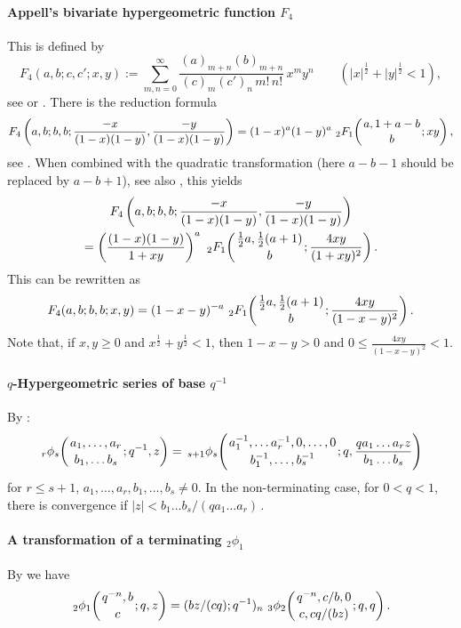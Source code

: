 \documentclass[twoside,11pt]{article}
\newcommand\half{\frac12}
\newcommand\thalf{\tfrac12}
\newcommand\iy\infty
\newcommand{\hyp}[5]{\,\mbox{}_{#1}F_{#2}\!\left(
  \genfrac{}{}{0pt}{}{#3}{#4};#5\right)}
\newcommand{\qhyp}[5]{\,\mbox{}_{#1}\phi_{#2}\!\left(
  \genfrac{}{}{0pt}{}{#3}{#4};#5\right)}
\begin{document}
\paragraph{Appell's bivariate hypergeometric function $F_4$}
This is defined by
\begin{equation}
F_4(a,b;c,c';x,y):=\sum_{m,n=0}^\iy\frac{(a)_{m+n}(b)_{m+n}}{(c)_m(c')_n\,m!\,n!}\,
x^my^n\qquad(|x|^\half+|y|^\half<1),
\label{62}
\end{equation}
see  or .
There is the reduction formula
\begin{equation*}
F_4\left(a,b;b,b;\frac{-x}{(1-x)(1-y)},\frac{-y}{(1-x)(1-y)}\right)=
(1-x)^a(1-y)^a\,\hyp21{a,1+a-b}b{xy},
\end{equation*}
see . When combined with the quadratic transformation
 (here $a-b-1$ should be replaced by $a-b+1$),
see also , this yields
\begin{multline*}
F_4\left(a,b;b,b;\frac{-x}{(1-x)(1-y)},\frac{-y}{(1-x)(1-y)}\right)\\
=\left(\frac{(1-x)(1-y)}{1+xy}\right)^a\,
\hyp21{\thalf a,\thalf(a+1)}b{\frac{4xy}{(1+xy)^2}}.
\end{multline*}
This can be rewritten as
\begin{equation}
F_4(a,b;b,b;x,y)=(1-x-y)^{-a}\,\hyp21{\thalf a,\thalf(a+1)}b
{\frac{4xy}{(1-x-y)^2}}.
\label{63}
\end{equation}
Note that, if $x,y\ge0$ and $x^\half+y^\half<1$, then
$1-x-y>0$ and $0\le\frac{4xy}{(1-x-y)^2}<1$.
%
\paragraph{$q$-Hypergeometric series of base $q^{-1}$}
By :
\begin{equation}
\qhyp rs{a_1,\ldots,a_r}{b_1,\ldots b_s}{q^{-1},z}
=\qhyp{s+1}s{a_1^{-1},\ldots a_r^{-1},0,\ldots,0}
{b_1^{-1},\ldots,b_s^{-1}}{q,\frac{qa_1\ldots a_rz}{b_1\ldots b_s}}
\label{154}
\end{equation}
for $r\le s+1$, $a_1,\ldots,a_r,b_1,\ldots,b_s\ne0$.
In the non-terminating case, for $0<q<1$, there is convergence if
$|z|<b_1\ldots b_s/(qa_1\ldots a_r)$\,.
%
\paragraph{A transformation of a terminating ${}_2\phi_1$}
By  we have
\begin{equation}
\qhyp21{q^{-n},b}c{q,z}=(bz/(cq);q^{-1})_n\,
\qhyp32{q^{-n},c/b,0}{c,cq/(bz)}{q,q}.
\label{151}
\end{equation}
%
\end{document}
